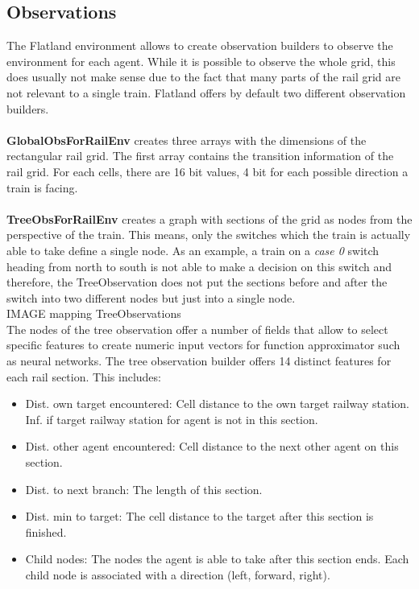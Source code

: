 \subsection*{Observations}\label{observations}
The Flatland environment allows to create observation builders to observe the environment for each agent. While it is possible to observe the whole grid, this does usually not make sense due to the fact that many parts of the rail grid are not relevant to a single train. Flatland offers by default two different observation builders.\\\\
\textbf{GlobalObsForRailEnv} creates three arrays with the dimensions of the rectangular rail grid. The first array contains the transition information of the rail grid. For each cells, there are 16 bit values, 4 bit for each possible direction a train is facing.\\\\
\textbf{TreeObsForRailEnv} creates a graph with sections of the grid as nodes from the perspective of the train.
This means, only the switches which the train is actually able to take define a single node. As an example, a train on a \textit{case 0} switch heading from north to south is not able to make a decision on this switch and therefore, the TreeObservation does not put the sections before and after the switch into two different nodes but just into a single node.
\\
IMAGE mapping TreeObservations
\\
The nodes of the tree observation offer a number of fields that allow to select specific features to create numeric input vectors for function approximator such as neural networks. The tree observation builder offers 14 distinct features for each rail section. This includes:
\begin{itemize}
	\item Dist. own target encountered: Cell distance to the own target railway station. Inf. if target railway station for agent is not in this section.
	\item Dist. other agent encountered: Cell distance to the next other agent on this section.
	\item Dist. to next branch: The length of this section.
	\item Dist. min to target: The cell distance to the target after this section is finished.
	\item Child nodes: The nodes the agent is able to take after this section ends. Each child node is associated with a direction (left, forward, right).
\end{itemize}

